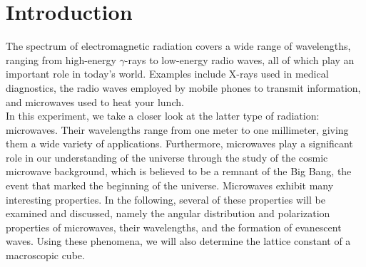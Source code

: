 \section{Introduction}\label{sec:intro}

The spectrum of electromagnetic radiation covers a wide range of wavelengths, ranging from high-energy $\gamma$-rays to low-energy radio waves,
all of which play an important role in today's world. Examples include X-rays used in medical diagnostics, the radio waves employed by mobile
phones to transmit information, and microwaves used to heat your lunch.\\
In this experiment, we take a closer look at the latter type of radiation: microwaves. Their wavelengths range from one meter to one millimeter,
giving them a wide variety of applications. Furthermore, microwaves play a significant role in our understanding of the universe through the study
of the cosmic microwave background, which is believed to be a remnant of the Big Bang, the event that marked the beginning of the universe.
Microwaves exhibit many interesting properties. In the following, several of these properties will be examined and discussed, namely the angular
distribution and polarization properties of microwaves, their wavelengths, and the formation of evanescent waves. Using these phenomena, we will
also determine the lattice constant of a macroscopic cube.